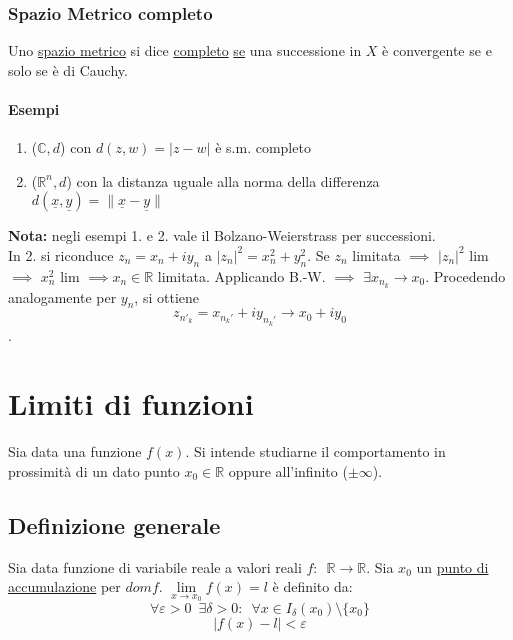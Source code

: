\documentclass[10pt]{article}
\theoremstyle{plain}
\begin{document}
\subsubsection{Spazio Metrico completo}
\begin{defin}
Uno \hyperlink{metrico}{spazio metrico} si dice \underline{completo} \underline{se} una successione in $X$ è convergente se e solo se è di Cauchy.
\end{defin}
\paragraph{Esempi}
\begin{enumerate}
    \item ($\mathbb{C}, d$) con $d(z,w) = |z - w|$ è s.m. completo
    \item ($\mathbb{R}^n, d$) con la distanza uguale alla norma della differenza $d(\underline{x}, \underline{y}) = \lVert \underline{x} - \underline{y} \rVert$
\end{enumerate}
\textbf{Nota:} negli esempi 1. e 2. vale il Bolzano-Weierstrass per successioni.\\
In 2. si riconduce $z_n = x_n + i y_n$ a 
$|z_n|^2 = x_n^2 + y_n^2$. 
Se $z_n$ limitata $\implies$ $|z_n|^2$ lim 
$\implies$ $x_n^2$ lim $\implies x_n \in \mathbb{R}$ limitata.
Applicando B.-W. $\implies$ $\exists x_{n_k} \rightarrow x_0$.
Procedendo analogamente per $y_n$, si ottiene \[z_{n'_k} = x_{n_k'} + i y_{n_k'} \longrightarrow x_0 + i y_0\].

\section{Limiti di funzioni}
Sia data una funzione $f(x)$. Si intende studiarne il comportamento in prossimità di un dato punto $x_0 \in \mathbb{R}$ oppure all'infinito ($\pm \infty$).

\subsection{Definizione generale}
\begin{defin}
Sia data funzione di variabile reale a valori reali $f : \enspace \mathbb{R} \rightarrow \mathbb{R}$. Sia $x_0$ un \hyperlink{accumulaz}{punto di accumulazione} per $dom f$. $\lim \limits_{x \rightarrow x_0} f(x) = l$ è definito da:
\[\forall \varepsilon > 0 \enspace \exists \delta > 0 : \enspace \forall x \in I_{\delta}(x_0) \setminus \{x_0\}\]
\[|f(x) - l| < \varepsilon\]
\end{defin}
\end{document}
